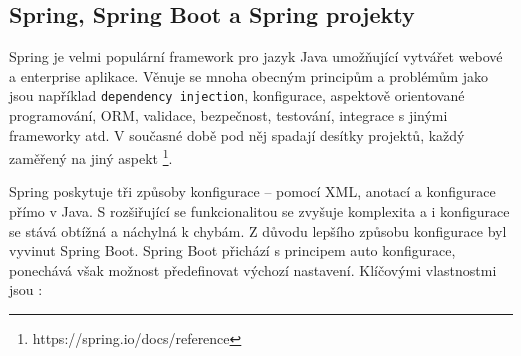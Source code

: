 \subsection{Spring, Spring Boot a Spring projekty}
Spring je velmi populární framework pro jazyk Java umožňující vytvářet webové a enterprise aplikace. Věnuje se mnoha obecným principům a problémům jako jsou například \texttt{dependency injection}, konfigurace, aspektově orientované programování, ORM, validace, bezpečnost, testování, integrace s jinými frameworky atd. V současné době pod něj spadají desítky projektů, každý zaměřený na jiný aspekt \footnote{https://spring.io/docs/reference}.

Spring poskytuje tři způsoby konfigurace -- pomocí XML, anotací a konfigurace přímo v Java. S rozšiřující se funkcionalitou se zvyšuje komplexita a i konfigurace se stává obtížná a náchylná k chybám. Z důvodu lepšího způsobu konfigurace byl vyvinut Spring Boot. Spring Boot přichází s principem auto konfigurace, ponechává však možnost předefinovat výchozí nastavení. Klíčovými vlastnostmi jsou \cite{whySpringBoot}:

